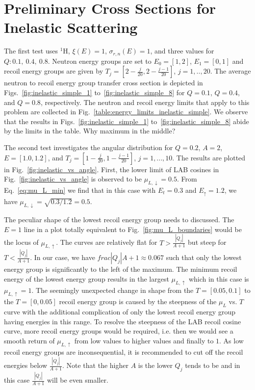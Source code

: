 \documentclass[review]{elsarticle}
\begin{document}
\section{Preliminary Cross Sections for Inelastic Scattering}
The first test uses $^1$H, $\xi(E)=1$, $\sigma_{r,n}(E)=1$, and three values for $Q: 0.1,~0.4,~0.8$. Neutron energy groups are set to $E_0 = [1,2]$, $E_1=[0,1]$ and 
recoil energy groups are given by $T_j=[2 - \frac{j}{20},2 - \frac{j-1}{20}]$, $j=1,..,20$. The average neutron to recoil energy group transfer cross section is depicted in Figs.~\ref{fig:inelastic_simple_1} to~\ref{fig:inelastic_simple_8} for $Q=0.1$, $Q=0.4$, and $Q=0.8$, respectively. The neutron and recoil energy limits that apply to this problem are collected in Fig.~\ref{table:energy_limits_inelastic_simple}. We observe that the results in Figs.~\ref{fig:inelastic_simple_1} to~\ref{fig:inelastic_simple_8} abide by the limits in the table. Why maximum in the middle?

The second test investigates the angular distribution for $Q=0.2$, $A=2$, $E=[1.0, 1.2]$, and $T_j = [1-\frac{j}{20},  1-\frac{j-1}{20}]$, $j=1,...,10$. The results are plotted in Fig.~\ref{fig:inelastic_vs_angle}. First, the lower limit of LAB cosines in Fig.~\ref{fig:inelastic_vs_angle} is observed to be $\mu_{L,\downarrow}=0.5$. From Eq.~\ref{eq:mu_L_min} we find that in this case with $E_t=0.3$ and $E_{\uparrow}=1.2$, we have $\mu_{L,\downarrow} = \sqrt{0.3/1.2}=0.5$. 

The peculiar shape of the lowest recoil energy group needs to discussed. The $E=1$ line in a plot totally equivalent to Fig.~\ref{fig:mu_L_boundaries} would be the locus of
$\mu_{L,\uparrow}$. The curves are relatively flat for $T>\frac{|Q_j|}{A+1}$ but steep for $T<\frac{|Q_j|}{A+1}$. In our case, we have $frac{|Q_j|}{A+1}\approx 0.067$ such that only the lowest energy group is significantly to the left of the maximum. The minimum recoil energy of the lowest energy group results in the largest $\mu_{L,\uparrow}$ which in this case is $\mu_{L,\uparrow}=1$. The seemingly unexpected change in shape from the $T=[0.05,0.1]$ to the $T=[0,0.05]$ recoil energy group is caused by the steepness of the $\mu_L$  vs. $T$ curve with the additional complication of only the lowest recoil energy group having energies in this range. To resolve the steepness of the LAB recoil cosine curve, more recoil energy groups would be required, i.e. then we would see a smooth return of $\mu_{L,\uparrow}$ from low values to higher values and finally to $1$. As low recoil energy groups are inconsequential, it is recommended to cut off the recoil energies below $\frac{|Q_j|}{A+1}$. Note that the higher $A$ is the lower $Q_j$ tends to be and in this case $\frac{|Q_j|}{A+1}$ will be even smaller.
\end{document}
